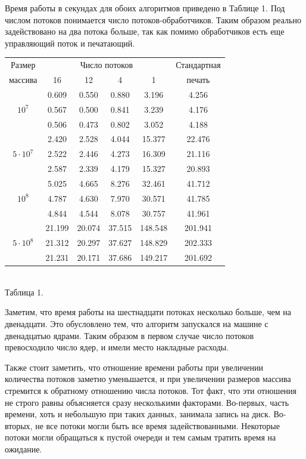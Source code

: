 Время работы в секундах для обоих алгоритмов приведено в Таблице 1.
Под числом потоков понимается число потоков-обработчиков. 
Таким образом реально задействовано на два потока больше, так как помимо обработчиков есть еще управляющий поток и печатающий.
\begin{center}
\begin{tabular}{||c|c|c|c|c|c||}
\hline
\hline
Размер & \multicolumn{4}{c|}{Число потоков} & Стандартная\\
\hhline{~|-|-|-|-|~|}
массива & 16 & 12 & 4 & 1 & печать \\
\hline
\hline
& 0.609 & 0.550 & 0.880 & 3.196 & 4.256 \\
\hhline{~|-|-|-|-|-|}
$10^7$ & 0.567 & 0.500 & 0.841 & 3.239 & 4.176 \\
\hhline{~|-|-|-|-|-|}
& 0.506 &0.473 & 0.802 & 3.052 & 4.188 \\
\hline
& 2.420 & 2.528 & 4.044 & 15.377 & 22.476 \\
\hhline{~|-|-|-|-|-|}
$5 \cdot 10^7$  & 2.522 & 2.446 & 4.273 & 16.309 & 21.116\\
\hhline{~|-|-|-|-|-|}
& 2.587 & 2.339 & 4.179 & 15.327 & 20.893 \\
\hline
& 5.025 & 4.665 & 8.276 & 32.461 & 41.712 \\
\hhline{~|-|-|-|-|-|}
$10^8$  & 4.787 & 4.630 & 7.970 & 30.571 & 41.785 \\
\hhline{~|-|-|-|-|-|}
& 4.844 & 4.544 & 8.078 & 30.757 & 41.961 \\
\hline
& 21.199 & 20.074 & 37.515 & 148.548 & 201.941 \\
\hhline{~|-|-|-|-|-|}
$5 \cdot 10^8$  & 21.312 & 20.297 & 37.627 & 148.829 & 202.333 \\
\hhline{~|-|-|-|-|-|}
 & 21.231 & 20.171 & 37.686 & 149.217 & 201.692 \\
\hline
\hline
\end{tabular}\\ \vspace{10pt}
\small{Таблица 1.}
\end{center}
Заметим, что время работы на шестнадцати потоках несколько больше, чем на двенадцати. 
Это обусловлено тем, что алгоритм запускался на машине с двенадцатью ядрами.
Таким образом в первом случае число потоков превосходило число ядер, и имели место накладные расходы.

Также стоит заметить, что отношение времени работы при увеличении количества потоков заметно уменьшается, и при увеличении размеров массива стремится к обратному отношению числа потоков.
Тот факт, что эти отношения не строго равны объясняется сразу несколькими факторами.
Во-первых, часть времени, хоть и небольшую при таких данных, занимала запись на диск.
Во-вторых, не все потоки могли быть все время задействованными.
Некоторые потоки могли обращаться к пустой очереди и тем самым тратить время на ожидание.

